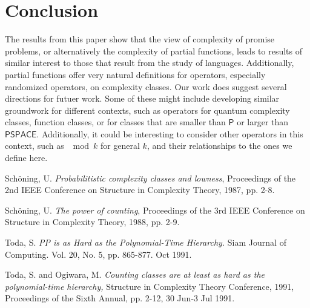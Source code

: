 \documentclass[11pt]{article}
\newcommand{\p}{\textsf{P}}
\begin{document}
\section{Conclusion}

The results from this paper show that the view of complexity of promise problems, or alternatively the complexity of partial functions, leads to results of similar interest to those that result from the study of languages. Additionally, partial functions offer very natural definitions for operators, especially randomized operators, on complexity classes. Our work does suggest several directions for futuer work.
Some of these might include developing similar groundwork for different contexts, such as operators for quantum complexity classes, function classes, or for classes that are smaller than $\p$ or larger than $\textsf{PSPACE}$. Additionally, it could be interesting to consider other operators in this context, such as $\mod k$ for general $k$, and their relationships to the ones we define here.

\pagebreak

\begin{thebibliography}{9}


 Sch\"oning, U. \emph{Probabilitistic complexity classes and lowness}, Proceedings of the 2nd IEEE Conference on Structure in Complexity Theory, 1987, pp. 2-8.

 Sch\"oning, U. \emph{The power of counting}, Proceedings of the 3rd IEEE Conference on Structure in Complexity Theory, 1988, pp. 2-9.

Toda, S. \emph{PP is as Hard as the Polynomial-Time Hierarchy.} Siam Journal of Computing. Vol. 20, No. 5, pp. 865-877. Oct 1991.

 Toda, S. and Ogiwara, M. \emph{Counting classes are at least as hard as the polynomial-time hierarchy,} Structure in Complexity Theory Conference, 1991, Proceedings of the Sixth Annual, pp. 2-12, 30 Jun-3 Jul 1991.

\end{thebibliography}
\end{document}
